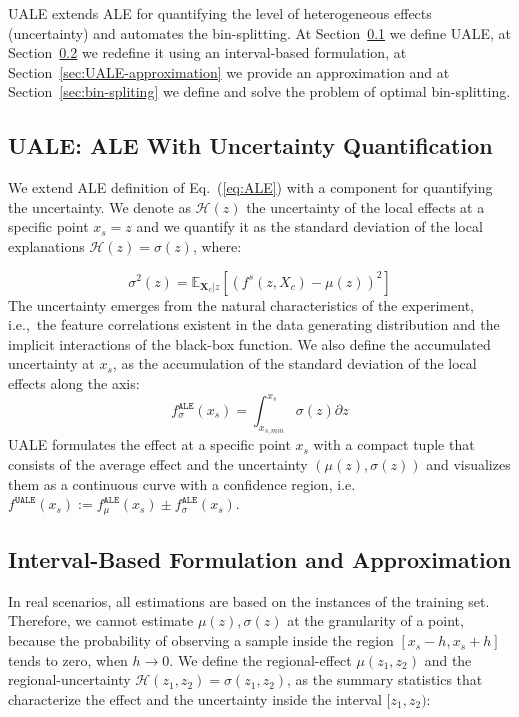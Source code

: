 \documentclass[twoside]{article}
\newcommand{\dfdx}{f^s}
\newcommand{\Xcb}{\mathbf{X}_c}
\begin{document}
UALE extends ALE for quantifying the level of heterogeneous effects
(uncertainty) and automates the bin-splitting. At
Section~\ref{sec:UALE-definition-1} we define UALE, at
Section~\ref{sec:UALE-definition-2} we redefine it using an
interval-based formulation, at
Section~\ref{sec:UALE-approximation} we provide an
approximation and at Section~\ref{sec:bin-spliting} we define and
solve the problem of optimal bin-splitting.

\subsection{UALE: ALE With Uncertainty Quantification}
\label{sec:UALE-definition-1}

We extend ALE definition of Eq.~(\ref{eq:ALE}) with a component for
quantifying the uncertainty. We denote as \(\mathcal{H}(z)\) the
uncertainty of the local effects at a specific point \(x_s=z\) and we
quantify it as the standard deviation of the local explanations
\(\mathcal{H}(z) = \sigma(z)\), where:

\begin{equation}
  \label{eq:ALE_var}
  \sigma^2(z) = \mathbb{E}_{\Xcb|z}\left [ \left (\dfdx (z, X_c) - \mu(z) \right )^2 \right ] 
\end{equation}
\noindent
The uncertainty emerges from the natural characteristics of the
experiment, i.e.,~the feature correlations existent in the data
generating distribution and the implicit interactions of the black-box
function. We also define the accumulated uncertainty at \(x_s\), as
the accumulation of the standard deviation of the local effects along
the axis:
\begin{equation}
  \label{eq:ALE_acc_unc}
  f^{\mathtt{ALE}}_{\sigma}(x_s) = \int_{x_{s, min}}^{x_s} \sigma(z) \partial z
\end{equation}
\noindent
UALE formulates the effect at a specific point \(x_s\) with a compact
tuple that consists of the average effect and the uncertainty
\((\mu(z), \sigma(z))\) and visualizes them as a continuous curve with
a confidence region, i.e.
\(f^{\mathtt{UALE}}(x_s) := f^{\mathtt{ALE}}_{\mu}(x_s) \pm
f^{\mathtt{ALE}}_{\sigma}(x_s)\).

\subsection{Interval-Based Formulation and Approximation}
\label{sec:UALE-definition-2}

In real scenarios, all estimations are based on the instances of the
training set. Therefore, we cannot estimate \(\mu(z), \sigma(z)\) at
the granularity of a point, because the probability of observing a
sample inside the region \([x_s - h, x_s + h]\) tends to zero, when
\(h \to 0\). We define the regional-effect \(\mu(z_1, z_2)\) and the
regional-uncertainty \(\mathcal{H}(z_1, z_2) = \sigma(z_1, z_2)\), as the summary statistics
that characterize the effect and the uncertainty inside the interval
\([z_1, z_2)\):
\end{document}
